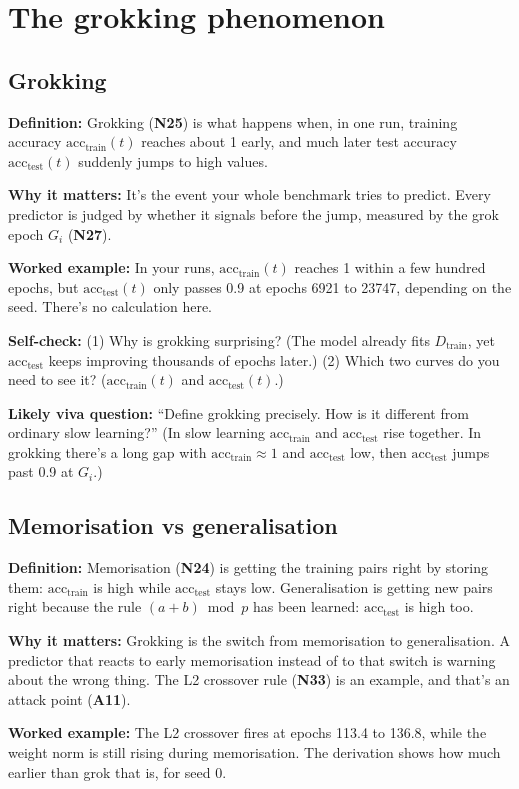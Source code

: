 \documentclass[11pt,a4paper,oneside,openany]{report}
\newcommand{\acctest}{\mathrm{acc}_{\mathrm{test}}}
\newcommand{\acctrain}{\mathrm{acc}_{\mathrm{train}}}
\newcommand{\Dtrain}{D_{\mathrm{train}}}
\newcommand{\gl}[1]{\textbf{#1}}   %
\newcommand{\fdef}{\textbf{Definition:} }
\newcommand{\fwhy}{\par\textbf{Why it matters:} }
\newcommand{\fex}{\par\textbf{Worked example:} }
\newcommand{\fself}{\par\textbf{Self-check:} }
\newcommand{\fviva}{\par\textbf{Likely viva question:} }
\begin{document}
\chapter{The grokking phenomenon}

\section{Grokking}
\fdef Grokking (\gl{N25}) is what happens when, in one run, training accuracy $\acctrain(t)$ reaches about 1 early, and much later test accuracy $\acctest(t)$ suddenly jumps to high values.
\fwhy It's the event your whole benchmark tries to predict. Every predictor is judged by whether it signals before the jump, measured by the grok epoch $G_i$ (\gl{N27}).
\fex In your runs, $\acctrain(t)$ reaches 1 within a few hundred epochs, but $\acctest(t)$ only passes 0.9 at epochs 6921 to 23747, depending on the seed. There's no calculation here.
\fself (1) Why is grokking surprising? (The model already fits $\Dtrain$, yet $\acctest$ keeps improving thousands of epochs later.) (2) Which two curves do you need to see it? ($\acctrain(t)$ and $\acctest(t)$.)
\fviva ``Define grokking precisely. How is it different from ordinary slow learning?'' (In slow learning $\acctrain$ and $\acctest$ rise together. In grokking there's a long gap with $\acctrain \approx 1$ and $\acctest$ low, then $\acctest$ jumps past 0.9 at $G_i$.)

\section{Memorisation vs generalisation}
\fdef Memorisation (\gl{N24}) is getting the training pairs right by storing them: $\acctrain$ is high while $\acctest$ stays low. Generalisation is getting new pairs right because the rule $(a+b) \bmod p$ has been learned: $\acctest$ is high too.
\fwhy Grokking is the switch from memorisation to generalisation. A predictor that reacts to early memorisation instead of to that switch is warning about the wrong thing. The L2 crossover rule (\gl{N33}) is an example, and that's an attack point (\gl{A11}).
\fex The L2 crossover fires at epochs 113.4 to 136.8, while the weight norm is still rising during memorisation. The derivation shows how much earlier than grok that is, for seed 0.
\end{document}
